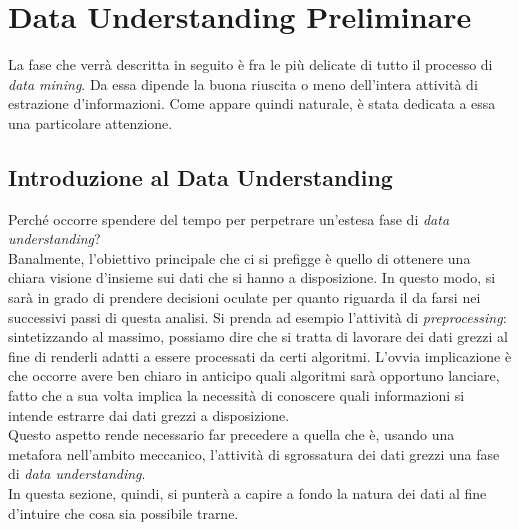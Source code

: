 
\chapter{Data Understanding Preliminare}
\label{ch:undst}

La fase che verrà descritta in seguito è fra le più delicate di tutto il processo di \textit{data mining}. Da essa dipende la buona riuscita o meno dell'intera attività di estrazione d'informazioni. Come appare quindi naturale, è stata dedicata a essa una particolare attenzione.

    \section{Introduzione al Data Understanding}

        Perché occorre spendere del tempo per perpetrare un'estesa fase di \textit{data understanding}? \\

        Banalmente, l'obiettivo principale che ci si prefigge è quello di ottenere una chiara visione d'insieme sui dati che si hanno a disposizione. In questo modo, si sarà in grado di prendere decisioni oculate per quanto riguarda il da farsi nei successivi passi di questa analisi. Si prenda ad esempio l'attività di \textit{preprocessing}: sintetizzando al massimo, possiamo dire che si tratta di lavorare dei dati grezzi al fine di renderli adatti a essere processati da certi algoritmi. L'ovvia implicazione è che occorre avere ben chiaro in anticipo quali algoritmi sarà opportuno lanciare, fatto che a sua volta implica la necessità di conoscere quali informazioni si intende estrarre dai dati grezzi a disposizione. \\

        Questo aspetto rende necessario far precedere a quella che è, usando una metafora nell'ambito meccanico, l'attività di sgrossatura dei dati grezzi una fase di \textit{data understanding}. \\

        In questa sezione, quindi, si punterà a capire a fondo la natura dei dati al fine d'intuire che cosa sia possibile trarne.

